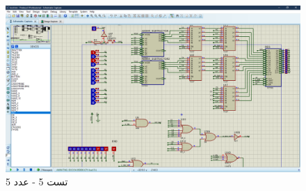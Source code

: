 \documentclass[fleqn]{article}
\begin{document}
\begin{figure}[!htbp]
    \includegraphics[width=\textwidth]{Assets/t5.png}
    \caption{تست 5 - عدد 5}
    \label{t5}
\end{figure}
\end{document}

